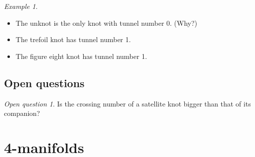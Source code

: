 \documentclass[a4paper]{book}
\theoremstyle{definition}
\theoremstyle{remark}
\theoremstyle{example}
\newtheorem{example}[theorem]{Example}
\newtheorem{openquestion}{Open question}
\begin{document}
\begin{example}
	\begin{itemize}
		\item The unknot is the only knot with tunnel number 0. (Why?)
		\item The trefoil knot has tunnel number 1.
		\item The figure eight knot has tunnel number 1.
	\end{itemize}
\end{example}

\section{Open questions}

\begin{openquestion}
	Is the crossing number of a satellite knot bigger than that of its companion?
\end{openquestion}
	
\chapter{4-manifolds}

{}


\printindex
\end{document}
